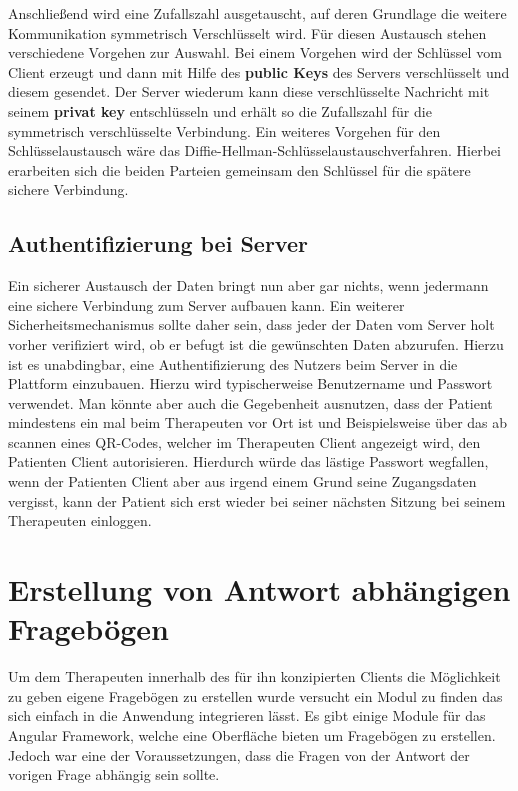 Anschließend wird eine Zufallszahl ausgetauscht, auf deren Grundlage die weitere Kommunikation symmetrisch Verschlüsselt wird. Für diesen Austausch stehen verschiedene Vorgehen zur Auswahl. Bei einem Vorgehen wird der Schlüssel vom Client erzeugt und dann mit Hilfe des \textbf{public Keys} des Servers verschlüsselt und diesem gesendet. Der Server wiederum kann diese verschlüsselte Nachricht mit seinem \textbf{privat key} entschlüsseln und erhält so die Zufallszahl für die symmetrisch verschlüsselte Verbindung. Ein weiteres Vorgehen für den Schlüsselaustausch wäre das Diffie-Hellman-Schlüsselaustauschverfahren. Hierbei erarbeiten sich die beiden Parteien gemeinsam den Schlüssel für die spätere sichere Verbindung.

\subsection{Authentifizierung bei Server}
Ein sicherer Austausch der Daten bringt nun aber gar nichts, wenn jedermann eine sichere Verbindung zum Server aufbauen kann. Ein weiterer Sicherheitsmechanismus sollte daher sein, dass jeder der Daten vom Server holt vorher verifiziert wird, ob er befugt ist die gewünschten Daten abzurufen.
Hierzu ist es unabdingbar, eine Authentifizierung des Nutzers beim Server in die Plattform einzubauen. Hierzu wird typischerweise Benutzername und Passwort verwendet. Man könnte aber auch die Gegebenheit ausnutzen, dass der Patient mindestens ein mal beim Therapeuten vor Ort ist und Beispielsweise über das ab scannen eines QR-Codes, welcher im Therapeuten Client angezeigt wird, den Patienten Client autorisieren. Hierdurch würde das lästige Passwort wegfallen, wenn der Patienten Client aber aus irgend einem Grund seine Zugangsdaten vergisst, kann der Patient sich erst wieder bei seiner nächsten Sitzung bei seinem Therapeuten einloggen.


\section{Erstellung von Antwort abhängigen Fragebögen}
Um dem Therapeuten innerhalb des für ihn konzipierten Clients die Möglichkeit zu geben eigene Fragebögen zu erstellen wurde versucht ein Modul zu finden das sich einfach in die Anwendung integrieren lässt. Es gibt einige Module für das Angular Framework, welche eine Oberfläche bieten um Fragebögen zu erstellen. Jedoch war eine der Voraussetzungen, dass die Fragen von der Antwort der vorigen Frage abhängig sein sollte.

